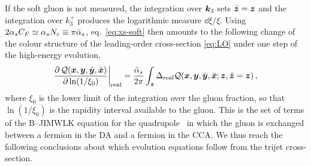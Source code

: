 If the soft gluon is not measured, the integration over $\bm{k}_3$ sets $\bar{\bm{z}}=\bm{z}$ and the integration over
$k_3^+$ produces the logarithmic measure $\dd\xi/\xi$. Using $2\alpha_sC_F\simeq\alpha_sN_c\equiv\pi\bar\alpha_s$,
eq.~\eqref{eq:xs-soft} then amounts to the following change of the colour structure of the
leading-order cross-section \eqref{eq:LO} under one step of the high-energy evolution,
\begin{equation}
\frac{\partial\,\mathcal{Q}(\bm{x},\bm{y},\bar{\bm{y}},\bar{\bm{x}})}{\partial\ln(1/\xi_0)}\bigg|_{\rm real}
=\frac{\bar\alpha_s}{2\pi}\int_{\bm{z}}\Delta_{\rm real}\mathcal{Q}(\bm{x},\bm{y},\bar{\bm{y}},\bar{\bm{x}};\bm{z},\bar{\bm{z}}=\bm{z})\,,
\label{eq:JIMWLK}
\end{equation}
where $\xi_0$ is the lower limit of the integration over the gluon fraction, so that
$\ln(1/\xi_0)$ is the rapidity interval available to the gluon. This is the set of terms of the B--JIMWLK equation for the
quadrupole~\cite{Dominguez:2011gc,Iancu:2011ns,Iancu:2011nj} in which the gluon is exchanged between a
fermion in the DA and a fermion in the CCA. We thus reach the following conclusions about which
evolution equations follow from the trijet cross-section.
